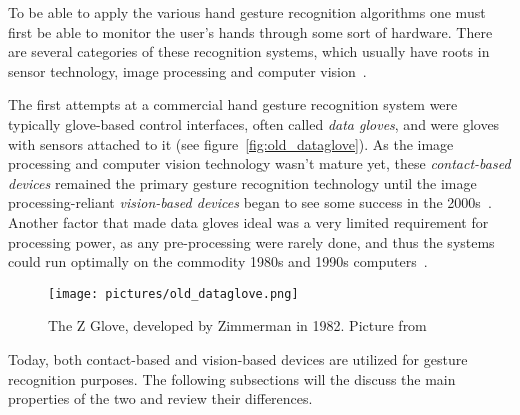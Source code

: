 To be able to apply the various hand gesture recognition algorithms one must first be able to monitor the user's hands through some sort of hardware. 
There are several categories of these recognition systems, which usually have roots in sensor technology, 
image processing and computer vision~\citep{Vafadar2014}.

The first attempts at a commercial hand gesture recognition system were typically glove-based control interfaces, often called \textit{data gloves},
and were gloves with sensors attached to it (see figure~\vref{fig:old_dataglove}). As the image processing and computer vision technology wasn't mature yet, these \textit{contact-based devices} remained 
the primary gesture recognition technology until the image processing-reliant \textit{vision-based devices} began to see some success in the 2000s~\citep{Premaratne2014}.
Another factor that made data gloves ideal was a very limited requirement for processing power, as any pre-processing were rarely done, 
and thus the systems could run optimally on the commodity 1980s and 1990s computers~\citep{Premaratne2014}.  


\begin{figure}%
	\texttt{[image: pictures/old\_dataglove.png]}
	\caption[The Z Glove]{The Z Glove, developed by Zimmerman in 1982. Picture from \citet{Premaratne2014}}
	\label{fig:old_dataglove}
\end{figure} 

Today, both contact-based and vision-based devices are utilized for gesture recognition purposes. 
The following subsections will the discuss the main properties of the two and review their differences.

